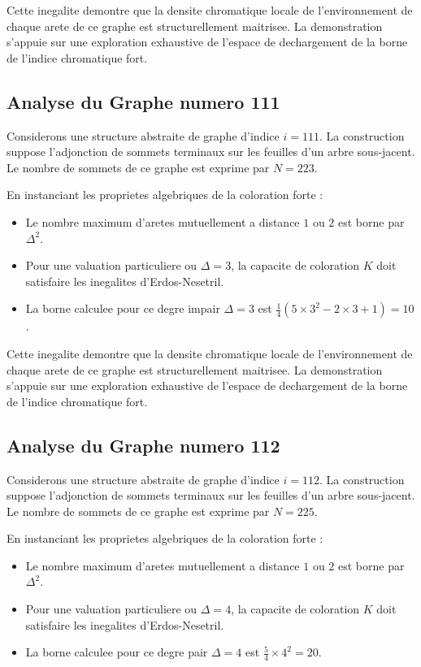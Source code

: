 \documentclass[11pt,a4paper]{article}
\begin{document}
Cette inegalite demontre que la densite chromatique locale de l'environnement de chaque arete de ce graphe est structurellement maitrisee. La demonstration s'appuie sur une exploration exhaustive de l'espace de dechargement de la borne de l'indice chromatique fort.

\subsection{Analyse du Graphe numero 111}
Considerons une structure abstraite de graphe d'indice $i = 111$. La construction suppose l'adjonction de sommets terminaux sur les feuilles d'un arbre sous-jacent. Le nombre de sommets de ce graphe est exprime par $N = 223$.

En instanciant les proprietes algebriques de la coloration forte :
\begin{itemize}
\item Le nombre maximum d'aretes mutuellement a distance $1$ ou $2$ est borne par $\Delta^2$.
\item Pour une valuation particuliere ou $\Delta = 3$, la capacite de coloration $K$ doit satisfaire les inegalites d'Erdos-Nesetril.
\item La borne calculee pour ce degre impair $\Delta = 3$ est $\frac{1}{4}(5 \times 3^2 - 2 \times 3 + 1) = 10$.
\end{itemize}

Cette inegalite demontre que la densite chromatique locale de l'environnement de chaque arete de ce graphe est structurellement maitrisee. La demonstration s'appuie sur une exploration exhaustive de l'espace de dechargement de la borne de l'indice chromatique fort.

\subsection{Analyse du Graphe numero 112}
Considerons une structure abstraite de graphe d'indice $i = 112$. La construction suppose l'adjonction de sommets terminaux sur les feuilles d'un arbre sous-jacent. Le nombre de sommets de ce graphe est exprime par $N = 225$.

En instanciant les proprietes algebriques de la coloration forte :
\begin{itemize}
\item Le nombre maximum d'aretes mutuellement a distance $1$ ou $2$ est borne par $\Delta^2$.
\item Pour une valuation particuliere ou $\Delta = 4$, la capacite de coloration $K$ doit satisfaire les inegalites d'Erdos-Nesetril.
\item La borne calculee pour ce degre pair $\Delta = 4$ est $\frac{5}{4} \times 4^2 = 20$.
\end{itemize}
\end{document}
